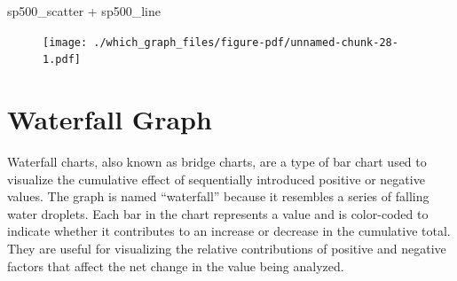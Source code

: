 \documentclass[
  letterpaper,
]{book}
\newenvironment{Shaded}{\begin{snugshade}}{\end{snugshade}}
\newcommand{\NormalTok}[1]{\textcolor[rgb]{0.00,0.23,0.31}{#1}}
\newcommand{\SpecialCharTok}[1]{\textcolor[rgb]{0.37,0.37,0.37}{#1}}
\begin{document}
\begin{Shaded}
\begin{Highlighting}[]
\NormalTok{sp500\_scatter }\SpecialCharTok{+}\NormalTok{ sp500\_line}
\end{Highlighting}
\end{Shaded}

\begin{figure}[H]

{\centering \texttt{[image: ./which\_graph\_files/figure-pdf/unnamed-chunk-28-1.pdf]}

}

\end{figure}

\hypertarget{waterfall-graph}{%
\section{Waterfall Graph}\label{waterfall-graph}}

Waterfall charts, also known as bridge charts, are a type of bar chart
used to visualize the cumulative effect of sequentially introduced
positive or negative values. The graph is named ``waterfall'' because it
resembles a series of falling water droplets. Each bar in the chart
represents a value and is color-coded to indicate whether it contributes
to an increase or decrease in the cumulative total. They are useful for
visualizing the relative contributions of positive and negative factors
that affect the net change in the value being analyzed.
\end{document}
